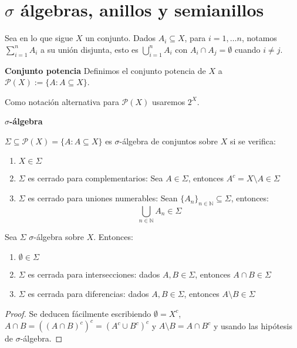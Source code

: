 \section{$\sigma$ álgebras, anillos y semianillos}

Sea en lo que sigue $X$ un conjunto. Dados $A_i \subseteq X$, para $i=1, \ldots n$, notamos $\sum_{i=1}^n A_i$
a su unión disjunta, esto es $\bigcup_{i=1}^n A_i$ con $A_i \cap A_j = \emptyset$ cuando $i\neq j$.

\begin{definition} \textbf{Conjunto potencia}
 Definimos el conjunto potencia de $X$ a $\mathcal{P}(X):= \{A: A\subseteq X\}$.
 
 Como notación alternativa para $\mathcal{P}(X)$ usaremos $2^X$.
\end{definition}


\begin{definition} \textbf{$\sigma$-álgebra}

 $\Sigma \subseteq \mathcal{P}(X) = \{A: A\subseteq X\}$ es $\sigma$-álgebra de conjuntos sobre $X$ si se verifica:
 
 \begin{enumerate}[i]
  \item $X \in \Sigma$
  \item $\Sigma$ es cerrado para complementarios: Sea $A\in \Sigma$, entonces $A^c = X\setminus A \in \Sigma$
  \item $\Sigma$ es cerrado para uniones numerables: Sean $\{A_n\}_{n\in\mathbb{N}} \subseteq \Sigma$, entonces: 
  \[\underset{n\in\mathbb{N}}{\bigcup} A_n \in \Sigma\]
 \end{enumerate}
\end{definition}

\begin{fact}
 Sea $\Sigma$ $\sigma$-álgebra sobre $X$. Entonces:
 
 \begin{enumerate}[i]
  \item $\emptyset \in \Sigma$
  \item $\Sigma$ es cerrada para intersecciones: dados $A,B \in \Sigma$, entonces $A\cap B \in \Sigma$
  \item $\Sigma$ es cerrada para diferencias: dados $A,B \in \Sigma$, entonces $A\setminus B \in \Sigma$
 \end{enumerate}
 
 \label{fact:propsigma}
\end{fact}

\begin{proof}
 Se deducen fácilmente escribiendo $\emptyset = X^c$, $A\cap B = ((A\cap B)^c)^c = (A^c \cup B^c)^c$ y $A\setminus B = A\cap B^c$
 y usando las hipótesis de $\sigma$-álgebra.
\end{proof}



